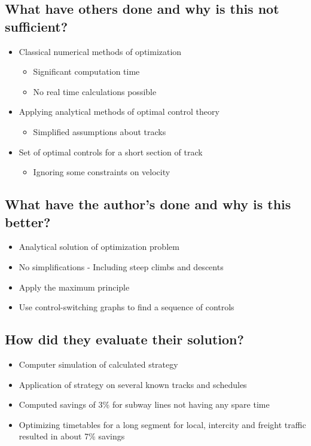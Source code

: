 \documentclass[paper=a4, fontsize=11pt]{scrartcl} %
\numberwithin{equation}{section} %
\numberwithin{figure}{section} %
\numberwithin{table}{section} %
\begin{document}
\subsection{What have others done and why is this not sufficient?}
\begin{itemize}
	\item Classical numerical methods of optimization
	\begin{itemize}
		\item Significant computation time
		\item No real time calculations possible
	\end{itemize}
	\item Applying analytical methods of optimal control theory
	\begin{itemize}
		\item Simplified assumptions about tracks
	\end{itemize}
	\item Set of optimal controls for a short section of track
	\begin{itemize}
		\item Ignoring some constraints on velocity
	\end{itemize}
\end{itemize}

\subsection{What have the author's done and why is this better?}
\begin{itemize}
	\item Analytical solution of optimization problem
	\item No simplifications - Including steep climbs and descents
	\item Apply the maximum principle
	\item Use control-switching graphs to find a sequence of controls
\end{itemize}



\subsection{How did they evaluate their solution?}
\begin{itemize}
	\item Computer simulation of calculated strategy
	\item Application of strategy on several known tracks and schedules
	\item Computed savings of 3\% for subway lines not having any spare time
	\item Optimizing timetables for a long segment for local, intercity and freight traffic resulted in about 7\% savings
\end{itemize}
\end{document}
